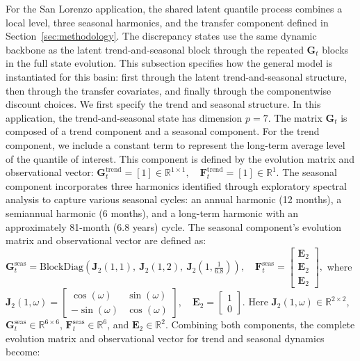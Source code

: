 \documentclass[APA,STIX1COL]{WileyNJD-v2}
\begin{document}
For the San Lorenzo application, the shared latent quantile process combines a local level, three seasonal harmonics, and the transfer component defined in Section~\ref{sec:methodology}. The discrepancy states use the same dynamic backbone as the latent trend-and-seasonal block through the repeated \(\mathbf{G}_t\) blocks in the full state evolution. This subsection specifies how the general model is instantiated for this basin: first through the latent trend-and-seasonal structure, then through the transfer covariates, and finally through the componentwise discount choices. We first specify the trend and seasonal structure. In this application, the trend-and-seasonal state has dimension \(p=7\). The matrix \(\mathbf{G}_t\) is composed of a trend component and a seasonal component. For the trend component, we include a constant term to represent the long-term average level of the quantile of interest. This component is defined by the evolution matrix and observational vector:
\( \mathbf{G}^{\text{trend}}_t = [1] \in \mathbb{R}^{1\times1}, \quad
\mathbf{F}^{\text{trend}}_t = [1] \in \mathbb{R}^{1}. \) The seasonal component incorporates three harmonics identified through exploratory spectral analysis to capture various seasonal cycles: an annual harmonic (12 months), a semiannual harmonic (6 months), and a long-term harmonic with an approximately 81-month (6.8 years) cycle. The seasonal component's evolution matrix and observational vector are defined as:
\( \mathbf{G}^{\text{seas}}_t = \text{BlockDiag}\left(\textbf{J}_2(1,1),\ \textbf{J}_2(1,2),\ \textbf{J}_2\left(1,\frac{1}{6.8}\right)\right),\quad
\mathbf{F}^{\text{seas}}_t  = 
\begin{bmatrix}
\mathbf{E}_2 \\[5pt]
\mathbf{E}_2 \\[5pt]
\mathbf{E}_2
\end{bmatrix}, \)
where
\( \textbf{J}_2(1,\omega) = 
\begin{bmatrix}
\cos(\omega) & \sin(\omega) \\[5pt]
-\sin(\omega) & \cos(\omega)
\end{bmatrix},\quad
\mathbf{E}_2 = 
\begin{bmatrix}
1 \\[5pt]
0
\end{bmatrix}. \)
Here \(\textbf{J}_2(1,\omega) \in \mathbb{R}^{2\times2}\), \(\mathbf{G}^{\text{seas}}_t \in \mathbb{R}^{6\times6}\), \(\mathbf{F}^{\text{seas}}_t \in \mathbb{R}^{6}\), and \(\mathbf{E}_2 \in \mathbb{R}^{2}\). Combining both components, the complete evolution matrix and observational vector for trend and seasonal dynamics become:
\end{document}
